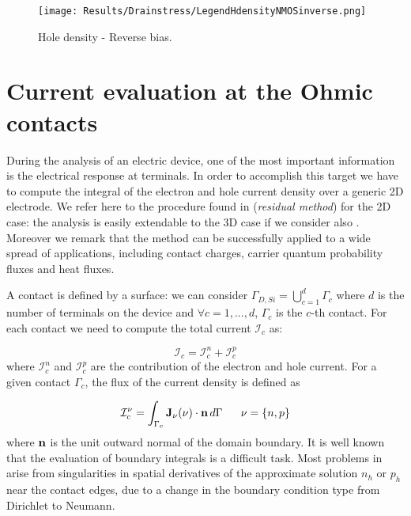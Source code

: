 \begin{figure}[!h]

\hspace{1cm}
\hspace{0.04\textwidth}
{\texttt{[image: Results/Drainstress/LegendHdensityNMOSinverse.png]}}
\caption{Hole density - Reverse bias.}
\label{fig: hole MOS negative}
\end{figure}

\clearpage

\section{Current evaluation at the Ohmic contacts}

During the analysis of an electric device, one of the most important information is the electrical response at terminals. In order to accomplish this target we have to compute the integral of the electron and hole current density over a generic 2D electrode. We refer here to the procedure found in \cite{ContactCurrentRM} (\textit{residual method}) for the 2D case: the analysis is easily extendable to the 3D case if we consider also \cite{GalerkMethConsHughes}. Moreover we remark that the method can be successfully applied to a wide spread of applications, including contact charges, carrier quantum probability fluxes and heat fluxes.

A contact is defined by a surface: we can consider $\Gamma_{D,Si} = \bigcup_{c=1}^d \Gamma_c$ where $d$ is the number of terminals on the device and $\forall c=1,...,d$, $\Gamma_c$ is the $c$-th contact. For each contact we need to compute the total current $\mathcal{I}_c$ as:

\begin{equation}
\mathcal{I}_c = \mathcal{I}_c^n + \mathcal{I}_c^p
\end{equation}
where $\mathcal{I}_c^n$ and $\mathcal{I}_c^p$ are the contribution of the electron and hole current.
For a given contact $\Gamma_c$, the flux of the current density is defined as

\begin{equation}
\label{eq: current flux}
\mathcal{I}_c^\nu = \int_{\Gamma_c}\vect{J}_\nu(\nu) \cdot \vect{n} \, d{\Gamma} \psp{10} \nu = \{n,p\}
\end{equation}
where $\mathbf{n}$ is the unit outward normal of the domain boundary. It is well known that the evaluation of boundary integrals is a difficult task. Most problems in  arise from singularities in spatial derivatives of the approximate solution $n_h$ or $p_h$ near the contact edges, due to a change in the boundary condition type from Dirichlet to Neumann.

